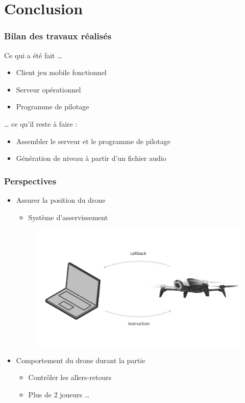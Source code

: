 \section{Conclusion}
\begin{frame}
\frametitle{Bilan des travaux réalisés}
Ce qui a été fait \dots
\begin{itemize}
\item Client jeu mobile fonctionnel
\item Serveur opérationnel
\item Programme de pilotage
\end{itemize}
\dots{} ce qu'il reste à faire :
\begin{itemize}
\item Assembler le serveur et le programme de pilotage
\item Génération de niveau à partir d'un fichier audio
\end{itemize}
\end{frame}

\begin{frame}
\frametitle{Perspectives}
\begin{center}
\begin{itemize}
\item Assurer la position du drone 
\begin{itemize}
\item Système d'asservissement
\end{itemize}
\begin{figure}
\includegraphics[scale=0.06]{images/callback.jpg}
\end{figure}
\item Comportement du drone durant la partie
\begin{itemize}
\item Contrôler les allers-retours
\item Plus de 2 joueurs \dots
\end{itemize}
\end{itemize}
\end{center}
\end{frame}